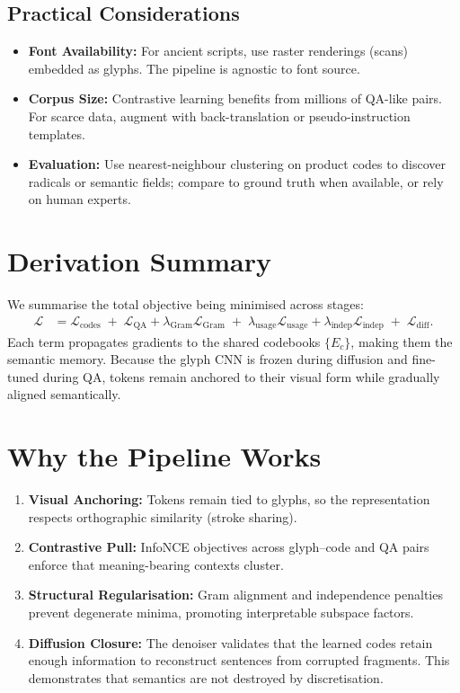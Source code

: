 \documentclass[11pt]{article}
\begin{document}
\subsection{Practical Considerations}
\begin{itemize}
    \item \textbf{Font Availability:} For ancient scripts, use raster renderings (scans) embedded as glyphs. The pipeline is agnostic to font source.
    \item \textbf{Corpus Size:} Contrastive learning benefits from millions of QA-like pairs. For scarce data, augment with back-translation or pseudo-instruction templates.
    \item \textbf{Evaluation:} Use nearest-neighbour clustering on product codes to discover radicals or semantic fields; compare to ground truth when available, or rely on human experts.
\end{itemize}

\section{Derivation Summary}
We summarise the total objective being minimised across stages:
\begin{align}
    \mathcal{L} &= \mathcal{L}_{\text{codes}} \;+\; \mathcal{L}_{\text{QA}} + \lambda_{\text{Gram}} \mathcal{L}_{\text{Gram}} \;+\; \lambda_{\text{usage}} \mathcal{L}_{\text{usage}} + \lambda_{\text{indep}} \mathcal{L}_{\text{indep}} \;+\; \mathcal{L}_{\text{diff}}.\label{eq:total-loss}
\end{align}
Each term propagates gradients to the shared codebooks $\{E_c\}$, making them the semantic memory. Because the glyph CNN is frozen during diffusion and fine-tuned during QA, tokens remain anchored to their visual form while gradually aligned semantically.

\section{Why the Pipeline Works}
\begin{enumerate}
    \item \textbf{Visual Anchoring:} Tokens remain tied to glyphs, so the representation respects orthographic similarity (stroke sharing).
    \item \textbf{Contrastive Pull:} InfoNCE objectives across glyph--code and QA pairs enforce that meaning-bearing contexts cluster.
    \item \textbf{Structural Regularisation:} Gram alignment and independence penalties prevent degenerate minima, promoting interpretable subspace factors.
    \item \textbf{Diffusion Closure:} The denoiser validates that the learned codes retain enough information to reconstruct sentences from corrupted fragments. This demonstrates that semantics are not destroyed by discretisation.
\end{enumerate}
\end{document}
